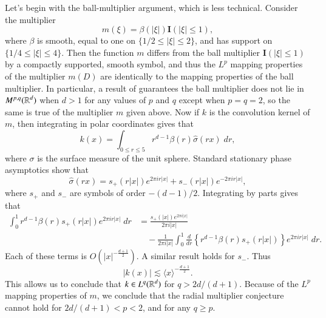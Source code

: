 Let's begin with the ball-multiplier argument, which is less technical. Consider the multiplier
%
\[ m(\xi) = \beta(|\xi|) \mathbf{I}(|\xi| \leq 1), \]
%
where $\beta$ is smooth, equal to one on $\{ 1/2 \leq |\xi| \leq 2 \}$, and has support on $\{ 1/4 \leq |\xi| \leq 4 \}$. Then the function $m$ differs from the ball multiplier $\mathbf{I}(|\xi| \leq 1)$ by a compactly supported, smooth symbol, and thus the $L^p$ mapping properties of the multiplier $m(D)$ are identically to the mapping properties of the ball multiplier. In particular, a result of \cite{Fefferman} guarantees the ball multiplier does not lie in $M^{p,q}(\operatorname{\mathbb{R}}^d)$ when $d > 1$ for any values of $p$ and $q$ except when $p = q = 2$, so the same is true of the multiplier $m$ given above. Now if $k$ is the convolution kernel of $m$, then integrating in polar coordinates gives that
%
\[ k(x) = \int_{0 \leq r \leq 5} r^{d-1} \beta(r) \widehat{\sigma}(r x)\; dr, \]
%
where $\sigma$ is the surface measure of the unit sphere. Standard stationary phase asymptotics show that
%
\[ \widehat{\sigma}(rx) = s_+(r |x|) e^{2 \pi i r |x|} + s_-(r |x|) e^{- 2 \pi i r |x|}, \]
%
where $s_+$ and $s_-$ are symbols of order $-(d-1)/2$. Integrating by parts gives that
%
\begin{align*}
    \int_0^1 r^{d-1} \beta(r) s_+(r|x|) e^{2 \pi i r |x|}\; dr &= \frac{s_+(|x|) e^{2 \pi i |x|}}{2 \pi i |x|}\\
    &\quad - \frac{1}{2 \pi i |x|} \int_0^1 \frac{d}{dr} \left\{ r^{d-1} \beta(r) s_+(r|x|) \right\} e^{2 \pi i r |x|}\; dr.
\end{align*}
%
Each of these terms is $O( |x|^{- \frac{d+1}{2}} )$. A similar result holds for $s_-$. Thus
%
\[ |k(x)| \lesssim \langle x \rangle^{- \frac{d+1}{2}}. \]
%
This allows us to conclude that $k \in L^q(\operatorname{\mathbb{R}}^d)$ for $q > 2d/(d+1)$. Because of the $L^p$ mapping properties of $m$, we conclude that the radial multiplier conjecture cannot hold for $2d/(d+1) < p < 2$, and for any $q \geq p$.

